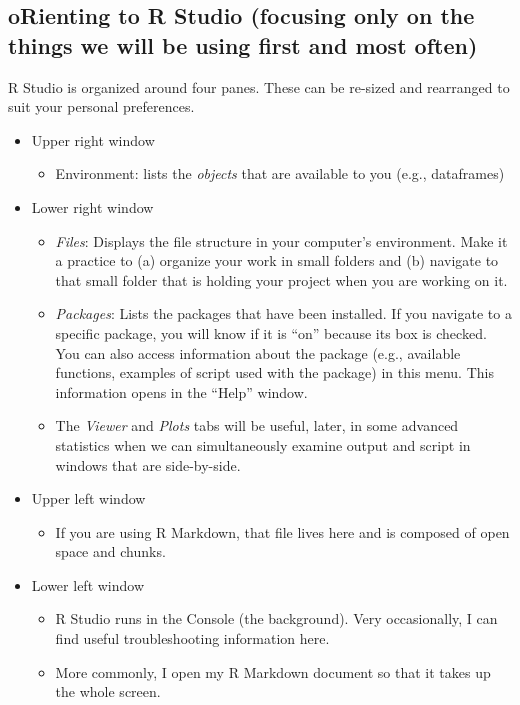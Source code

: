 \documentclass[
  11pt,
]{book}
\providecommand{\tightlist}{%
  \setlength{\itemsep}{0pt}\setlength{\parskip}{0pt}}
\begin{document}
\hypertarget{orienting-to-r-studio-focusing-only-on-the-things-we-will-be-using-first-and-most-often}{%
\subsection{oRienting to R Studio (focusing only on the things we will be using first and most often)}\label{orienting-to-r-studio-focusing-only-on-the-things-we-will-be-using-first-and-most-often}}

R Studio is organized around four panes. These can be re-sized and rearranged to suit your personal preferences.

\begin{itemize}
\tightlist
\item
  Upper right window

  \begin{itemize}
  \tightlist
  \item
    Environment: lists the \emph{objects} that are available to you (e.g., dataframes)
  \end{itemize}
\item
  Lower right window

  \begin{itemize}
  \tightlist
  \item
    \emph{Files}: Displays the file structure in your computer's environment. Make it a practice to (a) organize your work in small folders and (b) navigate to that small folder that is holding your project when you are working on it.
  \item
    \emph{Packages}: Lists the packages that have been installed. If you navigate to a specific package, you will know if it is ``on'' because its box is checked. You can also access information about the package (e.g., available functions, examples of script used with the package) in this menu. This information opens in the ``Help'' window.
  \item
    The \emph{Viewer} and \emph{Plots} tabs will be useful, later, in some advanced statistics when we can simultaneously examine output and script in windows that are side-by-side.
  \end{itemize}
\item
  Upper left window

  \begin{itemize}
  \tightlist
  \item
    If you are using R Markdown, that file lives here and is composed of open space and chunks.
  \end{itemize}
\item
  Lower left window

  \begin{itemize}
  \tightlist
  \item
    R Studio runs in the Console (the background). Very occasionally, I can find useful troubleshooting information here.
  \item
    More commonly, I open my R Markdown document so that it takes up the whole screen.
  \end{itemize}
\end{itemize}
\end{document}
